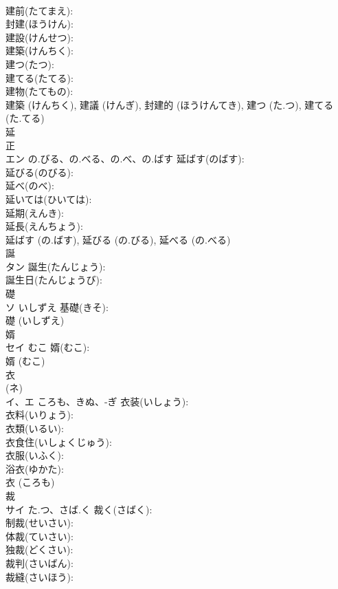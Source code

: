 \documentclass[8pt]{extreport}
\begin{document}
\begin{CJK}{UTF8}{min}
\\	建前(たてまえ): 
\\	封建(ほうけん): 
\\	建設(けんせつ): 
\\	建築(けんちく): 
\\	建つ(たつ): 
\\	建てる(たてる): 
\\	建物(たてもの): 
\\	建築 (けんちく), 建議 (けんぎ), 封建的 (ほうけんてき), 建つ (た.つ), 建てる (た.てる)
\\	延		
\\	正 
\\	エン	の.びる、の.べる、の.べ、の.ばす	延ばす(のばす): 
\\	延びる(のびる): 
\\	延べ(のべ): 
\\	延いては(ひいては): 
\\	延期(えんき): 
\\	延長(えんちょう): 
\\	延ばす (の.ばす), 延びる (の.びる), 延べる (の.べる)
\\	誕		
\\	タン		誕生(たんじょう): 
\\	誕生日(たんじょうび): 
\\	礎			
\\	ソ	いしずえ	基礎(きそ): 
\\	礎 (いしずえ)
\\	婿			
\\	セイ	むこ	婿(むこ): 
\\	婿 (むこ)
\\	衣			
\\	(ネ) 
\\	イ、エ	ころも、きぬ、-ぎ	衣装(いしょう): 
\\	衣料(いりょう): 
\\	衣類(いるい): 
\\	衣食住(いしょくじゅう): 
\\	衣服(いふく): 
\\	浴衣(ゆかた): 
\\	衣 (ころも)
\\	裁			
\\	サイ	た.つ、さば.く	裁く(さばく): 
\\	制裁(せいさい): 
\\	体裁(ていさい): 
\\	独裁(どくさい): 
\\	裁判(さいばん): 
\\	裁縫(さいほう): 

\end{CJK}
\end{document}
